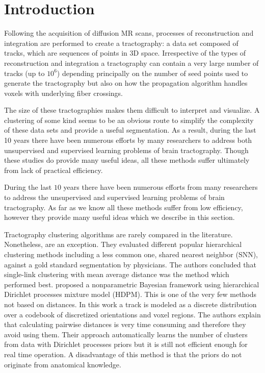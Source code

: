 \documentclass{bioinfo}
\begin{document}
\section{Introduction}

Following the acquisition of diffusion MR scans, processes of
reconstruction and integration are performed to
create a tractography: a data set composed of tracks, which are
sequences of points in 3D space. Irrespective of the types of
reconstruction and integration a tractography can contain a very large
number of tracks (up to $10^6$) depending principally on the number of
seed points used to generate the tractography but also on how the
propagation algorithm handles voxels with underlying fiber crossings.

The size of these tractographies makes them difficult to interpret and
visualize. A clustering of some kind seems to be an obvious route to
simplify the complexity of these data sets and provide a useful
segmentation.  As a result, during the last 10 years there have been
numerous efforts by many researchers to address both unsupervised and
supervised learning problems of brain tractography. Though these studies
do provide many useful ideas, all these methods suffer ultimately from
lack of practical efficiency.

During the last $10$ years there have been numerous efforts from many
researchers to address the unsupervised and supervised learning problems
of brain tractography. As far as we know all these methods suffer from
low efficiency, however they provide many useful ideas which we describe
in this section.

Tractography clustering algorithms are rarely compared in the
literature.  Nonetheless, \citet{moberts2005evaluation} are an
exception. They evaluated different popular hierarchical clustering
methods including a less common one, shared nearest neighbor (SNN),
against a gold standard segmentation by physicians. The authors
concluded that single-link clustering with mean average distance was the
method which performed best. \citet{wang2010tractography} proposed a
nonparametric Bayesian framework using hierarchical Dirichlet processes
mixture model (HDPM). This is one of the very few methods not based on
distances. In this work a track is modeled as a discrete distribution
over a codebook of discretized orientations and voxel regions. The
authors explain that calculating pairwise distances is very time
consuming and therefore they avoid using them. Their approach
automatically learns the number of clusters from data with Dirichlet
processes priors but it is still not efficient enough for real time
operation. A disadvantage of this method is that the priors do not
originate from anatomical knowledge.
\end{document}
